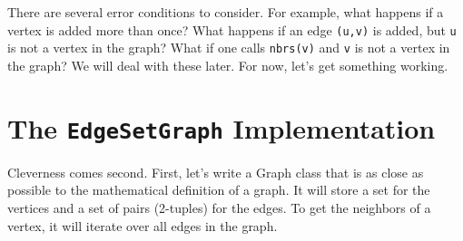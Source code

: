There are several error conditions to consider. For example, what happens if a vertex is added more than once?
What happens if an edge \texttt{(u,v)} is added, but \texttt{u} is not a vertex in the graph?
What if one calls \texttt{nbrs(v)} and \texttt{v} is not a vertex in the graph?
We will deal with these later.
For now, let's get something working.

\section{The \texttt{EdgeSetGraph} Implementation}


Cleverness comes second.
First, let's write a Graph class that is as close as possible to the mathematical definition of a graph.
It will store a set for the vertices and a set of pairs (2-tuples) for the edges.
To get the neighbors of a vertex, it will iterate over all edges in the graph.

